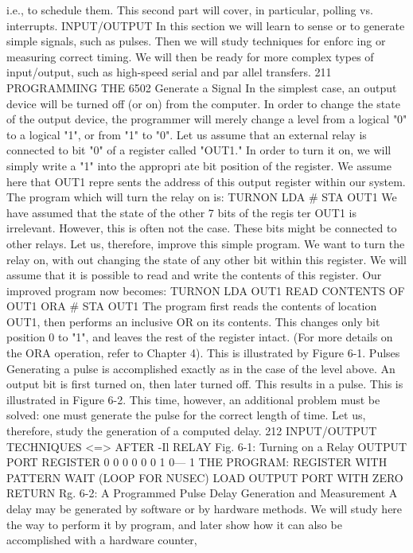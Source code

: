 i.e., to schedule them. This second part will cover, in particular,
polling vs. interrupts.
INPUT/OUTPUT
In this section we will learn to sense or to generate simple
signals, such as pulses. Then we will study techniques for enforc
ing or measuring correct timing. We will then be ready for more
complex types of input/output, such as high-speed serial and par
allel transfers.
211
PROGRAMMING THE 6502
Generate a Signal
In the simplest case, an output device will be turned off (or on)
from the computer. In order to change the state of the output
device, the programmer will merely change a level from a logical
"0" to a logical "1", or from "1" to "0". Let us assume that an
external relay is connected to bit "0" of a register called "OUT1."
In order to turn it on, we will simply write a "1" into the appropri
ate bit position of the register. We assume here that OUT1 repre
sents the address of this output register within our system. The
program which will turn the relay on is:
TURNON LDA #%
STA OUT1
We have assumed that the state of the other 7 bits of the regis
ter OUT1 is irrelevant. However, this is often not the case.
These bits might be connected to other relays. Let us, therefore,
improve this simple program. We want to turn the relay on, with
out changing the state of any other bit within this register. We
will assume that it is possible to read and write the contents of
this register. Our improved program now becomes:
TURNON LDA OUT1 READ CONTENTS OF OUT1
ORA #%
STA OUT1
The program first reads the contents of location OUT1, then
performs an inclusive OR on its contents. This changes only bit
position 0 to "1", and leaves the rest of the register intact. (For
more details on the ORA operation, refer to Chapter 4). This is
illustrated by Figure 6-1.
Pulses
Generating a pulse is accomplished exactly as in the case of
the level above. An output bit is first turned on, then later turned
off. This results in a pulse. This is illustrated in Figure 6-2. This
time, however, an additional problem must be solved: one must
generate the pulse for the correct length of time. Let us, therefore,
study the generation of a computed delay.
212
INPUT/OUTPUT TECHNIQUES
<=>
AFTER
-Il RELAY
Fig. 6-1: Turning on a Relay
OUTPUT PORT
REGISTER
0
0
0
0
0
0
1
0— 1
THE PROGRAM:
REGISTER WITH PATTERN
WAIT (LOOP FOR NUSEC)
LOAD OUTPUT PORT WITH ZERO
RETURN
Rg. 6-2: A Programmed Pulse
Delay Generation and Measurement
A delay may be generated by software or by hardware methods.
We will study here the way to perform it by program, and later
show how it can also be accomplished with a hardware counter,
